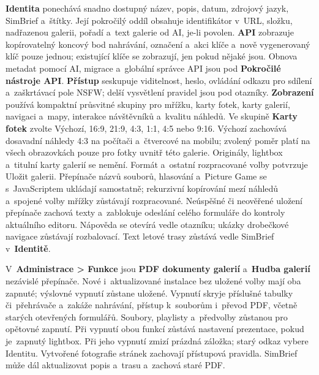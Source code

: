 \documentclass[11pt,a4paper]{article}
\newcommand{\ui}[1]{\textbf{#1}}
\begin{document}
\ui{Identita} ponechává snadno dostupný název, popis, datum, zdrojový jazyk,
SimBrief a~štítky. Její pokročilý oddíl obsahuje identifikátor v~URL, složku,
nadřazenou galerii, pořadí a~text galerie od AI, je-li povolen. \ui{API}
zobrazuje kopírovatelný koncový bod nahrávání, označení a~akci klíče a~nově
vygenerovaný klíč pouze jednou; existující klíče se zobrazují, jen pokud nějaké
jsou. Obnova metadat pomocí AI, migrace a~globální správce API jsou pod
\ui{Pokročilé nástroje API}. \ui{Přístup} seskupuje viditelnost, heslo, ovládání
odkazu pro sdílení a~zaškrtávací pole NSFW; delší vysvětlení pravidel jsou pod
otazníky. \ui{Zobrazení} používá kompaktní průsvitné skupiny pro mřížku, karty
fotek,
karty galerií, navigaci a~mapy, interakce návštěvníků a~kvalitu náhledů.
Ve skupině \ui{Karty fotek} zvolte Výchozí, 16:9, 21:9, 4:3, 1:1, 4:5 nebo 9:16.
Výchozí zachovává dosavadní náhledy 4:3 na počítači a~čtvercové na mobilu;
zvolený poměr platí na všech obrazovkách pouze pro fotky uvnitř této galerie.
Originály, lightbox a~titulní karty galerií se nemění. Formát a~ostatní
rozpracované volby potvrzuje Uložit galerii. Přepínače názvů souborů,
hlasování a~Picture Game se s~JavaScriptem ukládají samostatně; rekurzivní
kopírování mezí náhledů a~spojené volby mřížky zůstávají rozpracované.
Neúspěšné či neověřené uložení přepínače zachová texty a~zablokuje odeslání
celého formuláře do kontroly aktuálního editoru. Nápověda se otevírá vedle
otazníku; ukázky drobečkové navigace zůstávají rozbalovací.
Text letové trasy zůstává vedle SimBrief v~\ui{Identitě}.

V~\ui{Administrace > Funkce} jsou \ui{PDF dokumenty galerií} a~\ui{Hudba
galerií} nezávislé přepínače. Nové i~aktualizované instalace bez uložené volby
mají oba zapnuté; výslovné vypnutí zůstane uložené. Vypnutí skryje příslušné
tabulky či~přehrávače a~zakáže nahrávání, přístup k~souborům i~převod PDF,
včetně starých otevřených formulářů. Soubory, playlisty a~předvolby zůstanou
pro opětovné zapnutí. Při vypnutí obou funkcí zůstává nastavení prezentace,
pokud je~zapnutý lightbox. Při jeho vypnutí zmizí prázdná záložka;
starý odkaz vybere Identitu. Vytvořené fotografie stránek zachovají přístupová
pravidla. SimBrief může dál aktualizovat popis a~trasu a~zachová staré PDF.
\end{document}
